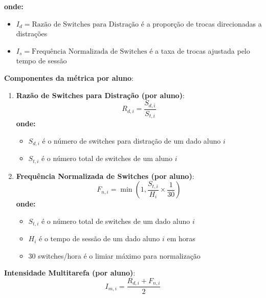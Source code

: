 \textbf{onde:}
\begin{itemize}
    \item $I_d = \text{Razão de Switches para Distração}$ é a proporção de trocas direcionadas a distrações
    \item $I_s = \text{Frequência Normalizada de Switches}$ é a taxa de trocas ajustada pelo tempo de sessão
\end{itemize}

% 

\textbf{Componentes da métrica por aluno}:
\begin{enumerate}
    \item \textbf{Razão de Switches para Distração (por aluno)}:
    \begin{equation}
    R_{d,i} = \frac{S_{d,i}}{S_{t,i}}
    \end{equation}
    \textbf{onde:}
    \begin{itemize}
        \item $S_{d,i}$ é o número de switches para distração de um dado aluno $i$
        \item $S_{t,i}$ é o número total de switches de um aluno $i$
    \end{itemize}
    
    \item \textbf{Frequência Normalizada de Switches (por aluno)}:
    \begin{equation}
    F_{n,i} = \min\left(1, \frac{S_{t,i}}{H_i} \times \frac{1}{30}\right)
    \end{equation}
    \textbf{onde:}
    \begin{itemize}
        \item $S_{t,i}$ é o número total de switches de um dado aluno $i$
        \item $H_i$ é o tempo de sessão de um dado aluno $i$ em horas
        \item 30 switches/hora é o limiar máximo para normalização
    \end{itemize}
\end{enumerate}

\textbf{Intensidade Multitarefa (por aluno)}:
\begin{equation}
I_{m,i} = \frac{R_{d,i} + F_{n,i}}{2}
\end{equation}

